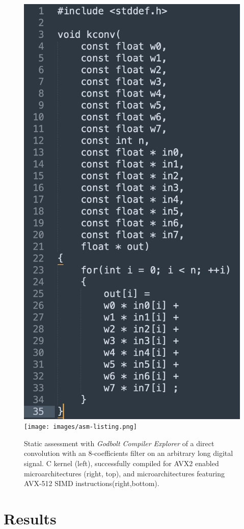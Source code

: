 \documentclass[]{usiinfbachelorproject}
\begin{document}
		\begin{figure}
			\centering
			\includegraphics[height=0.45\columnwidth]{images/normal_code.png}\hspace*{0.1\columnwidth}
			\texttt{[image: images/asm-listing.png]}\\
			\caption{Static assessment with {\it Godbolt Compiler Explorer} of a direct convolution with an 8-coefficients filter on an arbitrary long digital signal. C kernel (left), successfully compiled for AVX2 enabled microarchitectures (right, top), and microarchitectures featuring AVX-512 SIMD instructions(right,bottom). }
			\label{fig:conv_assembly}
		\end{figure}
		
		\newpage
		\section{Results}
\end{document}
